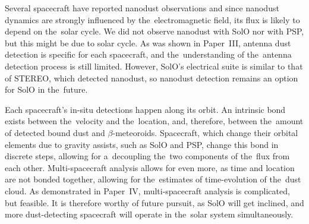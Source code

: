 Several spacecraft have reported nanodust observations and since nanodust dynamics are strongly influenced by the~electromagnetic field, its flux is likely to depend on the~solar cycle. We did not observe nanodust with SolO nor with PSP, but this might be due to solar cycle. As was shown in Paper~III, antenna dust detection is specific for each spacecraft, and the~understanding of the~antenna detection process is still limited. However, SolO's electrical suite is similar to that of STEREO, which detected nanodust, so nanodust detection remains an option for SolO in the~future.  

Each spacecraft's in-situ detections happen along its orbit. An intrinsic bond exists between the~velocity and the~location, and, therefore, between the~amount of detected bound dust and \mbox{$\beta$-meteoroids}. Spacecraft, which change their orbital elements due to gravity assists, such as SolO and PSP, change this bond in discrete steps, allowing for a~decoupling the~two components of the~flux from each other. Multi-spacecraft analysis allows for even more, as time and location are not bonded together, allowing for the~estimates of time-evolution of the~dust cloud. As demonstrated in Paper~IV, multi-spacecraft analysis is complicated, but feasible. It is therefore worthy of future pursuit, as SolO will get inclined, and more dust-detecting spacecraft will operate in the~solar system simultaneously. 